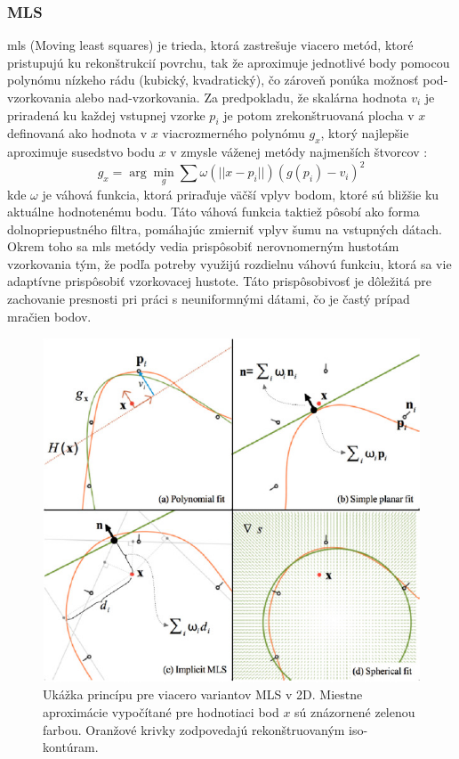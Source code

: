\subsubsection{MLS}
\noindent \acrshort{mls} (Moving least squares) je trieda, ktorá zastrešuje viacero metód, ktoré pristupujú ku rekonštrukcií povrchu, tak že aproximuje jednotlivé body pomocou polynómu nízkeho rádu (kubický, kvadratický), čo zároveň ponúka možnosť pod-vzorkovania alebo nad-vzorkovania. \cite{MLS_survey}
\newline\indent Za predpokladu, že skalárna hodnota $v_i$ je priradená ku každej vstupnej vzorke $p_i$ je potom zrekonštruovaná plocha v $x$ definovaná ako hodnota v $x$ viacrozmerného polynómu $g_x$, ktorý najlepšie aproximuje susedstvo bodu $x$ v zmysle váženej metódy najmenších štvorcov \cite{MLS_survey}:
\begin{equation}
    g_x = \arg\min_{g}\sum\omega(||x-p_i||)(g(p_i)-v_i)^2
    \label{eq:mls}
\end{equation}
\indent kde $\omega$ je váhová funkcia, ktorá priraďuje väčší vplyv bodom, ktoré sú bližšie ku aktuálne hodnotenému bodu. Táto váhová funkcia taktiež pôsobí ako forma dolnopriepustného filtra, pomáhajúc zmierniť vplyv šumu na vstupných dátach. Okrem toho sa \acrshort{mls} metódy vedia prispôsobiť nerovnomerným hustotám vzorkovania tým, že podľa potreby využijú rozdielnu váhovú funkciu, ktorá sa vie adaptívne prispôsobiť vzorkovacej hustote. Táto prispôsobivosť je dôležitá pre zachovanie presnosti pri práci s neuniformnými dátami, čo je častý prípad mračien bodov. \cite{MLS_survey}
\begin{figure}[!htbp]
  \centering
  \includegraphics[width=13cm]{img/MLS.jpg}
  \caption{Ukážka princípu pre viacero variantov MLS v 2D. Miestne aproximácie vypočítané pre hodnotiaci bod $x$ sú znázornené zelenou farbou. Oranžové krivky zodpovedajú rekonštruovaným iso-kontúram. \cite{MLS_survey}} 
  \label{fig:MLS}
\end{figure} 

